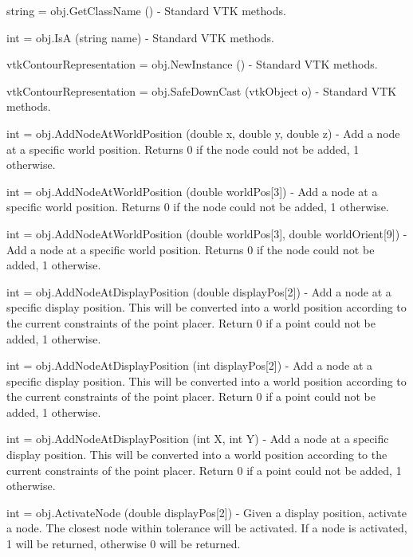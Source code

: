 \begin{DoxyItemize}
\item {\ttfamily string = obj.\-Get\-Class\-Name ()} -\/ Standard V\-T\-K methods.  
\item {\ttfamily int = obj.\-Is\-A (string name)} -\/ Standard V\-T\-K methods.  
\item {\ttfamily vtk\-Contour\-Representation = obj.\-New\-Instance ()} -\/ Standard V\-T\-K methods.  
\item {\ttfamily vtk\-Contour\-Representation = obj.\-Safe\-Down\-Cast (vtk\-Object o)} -\/ Standard V\-T\-K methods.  
\item {\ttfamily int = obj.\-Add\-Node\-At\-World\-Position (double x, double y, double z)} -\/ Add a node at a specific world position. Returns 0 if the node could not be added, 1 otherwise.  
\item {\ttfamily int = obj.\-Add\-Node\-At\-World\-Position (double world\-Pos\mbox{[}3\mbox{]})} -\/ Add a node at a specific world position. Returns 0 if the node could not be added, 1 otherwise.  
\item {\ttfamily int = obj.\-Add\-Node\-At\-World\-Position (double world\-Pos\mbox{[}3\mbox{]}, double world\-Orient\mbox{[}9\mbox{]})} -\/ Add a node at a specific world position. Returns 0 if the node could not be added, 1 otherwise.  
\item {\ttfamily int = obj.\-Add\-Node\-At\-Display\-Position (double display\-Pos\mbox{[}2\mbox{]})} -\/ Add a node at a specific display position. This will be converted into a world position according to the current constraints of the point placer. Return 0 if a point could not be added, 1 otherwise.  
\item {\ttfamily int = obj.\-Add\-Node\-At\-Display\-Position (int display\-Pos\mbox{[}2\mbox{]})} -\/ Add a node at a specific display position. This will be converted into a world position according to the current constraints of the point placer. Return 0 if a point could not be added, 1 otherwise.  
\item {\ttfamily int = obj.\-Add\-Node\-At\-Display\-Position (int X, int Y)} -\/ Add a node at a specific display position. This will be converted into a world position according to the current constraints of the point placer. Return 0 if a point could not be added, 1 otherwise.  
\item {\ttfamily int = obj.\-Activate\-Node (double display\-Pos\mbox{[}2\mbox{]})} -\/ Given a display position, activate a node. The closest node within tolerance will be activated. If a node is activated, 1 will be returned, otherwise 0 will be returned.  

\end{DoxyItemize}
